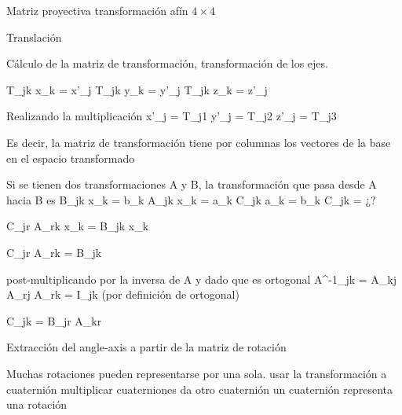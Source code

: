 Matriz proyectiva transformación afín $4\times4$

Translación

Cálculo de la matriz de transformación,
transformación de los ejes.

T_{jk} x_{k} = {x'}_{j}
T_{jk} y_{k} = {y'}_{j}
T_{jk} z_{k} = {z'}_{j}

Realizando la multiplicación
{x'}_j = T_{j1}
{y'}_j = T_{j2}
{z'}_j = T_{j3}

Es decir, la matriz de transformación tiene por columnas los vectores de la base en el espacio transformado

Si se tienen dos transformaciones A y B, la transformación que pasa desde A hacia B es
B_jk x_k = b_k
A_jk x_k = a_k
C_jk a_k = b_k
C_jk = ¿?


C_jr A_rk x_k = B_jk x_k

C_jr A_rk = B_jk

post-multiplicando por la inversa de A
y dado que es ortogonal A^-1_jk = A_kj
A_rj A_rk = I_jk (por definición de ortogonal) 

C_jk = B_jr A_kr


Extracción del angle-axis a partir de la matriz de rotación


Muchas rotaciones pueden representarse por una sola. 
usar la transformación a cuaternión
multiplicar cuaterniones da otro cuaternión
un cuaternión representa una rotación
